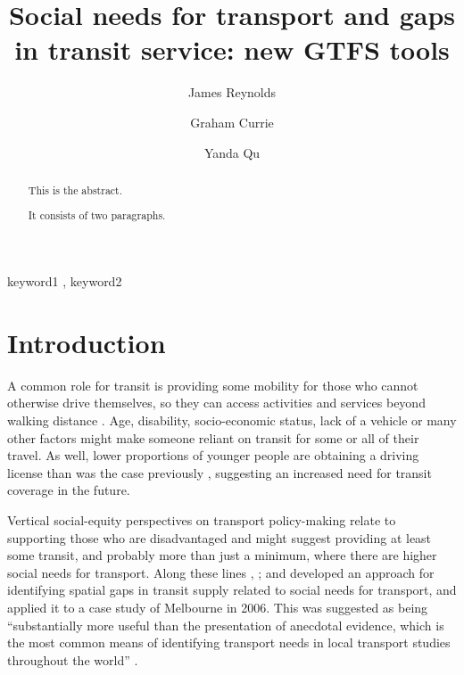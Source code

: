 \documentclass[preprint, 3p,
authoryear]{elsarticle} %
\begin{document}
\begin{frontmatter}

  \title{Social needs for transport and gaps in transit service: new
GTFS tools}
    \author[Public Transport Research Group (PTRG)]{James Reynolds%
  }
    \author[Public Transport Research Group (PTRG)]{Graham Currie%
  }
    \author[Public Transport Research Group (PTRG)]{Yanda Qu%
  }
  
  \begin{abstract}
  This is the abstract.

  It consists of two paragraphs.
  \end{abstract}
    \begin{keyword}
    keyword1 \sep 
    keyword2
  \end{keyword}
  
 \end{frontmatter}

\section{Introduction}\label{introduction}

A common role for transit is providing some mobility for those who
cannot otherwise drive themselves, so they can access activities and
services beyond walking distance \citep{Currie:2016aa}. Age, disability,
socio-economic status, lack of a vehicle or many other factors might
make someone reliant on transit for some or all of their travel. As
well, lower proportions of younger people are obtaining a driving
license than was the case previously \citep{delbosc2013causes},
suggesting an increased need for transit coverage in the future.

Vertical social-equity perspectives on transport policy-making relate to
supporting those who are disadvantaged \citep{Litman:2016aa} and might
suggest providing at least some transit, and probably more than just a
minimum, where there are higher social needs for transport. Along these
lines \citet{Currie2003Hobart}, \citet{Currie2004Gap};
\citet{Currie2007Identifying} and \citet{currie2010identifying}
developed an approach for identifying spatial gaps in transit supply
related to social needs for transport, and applied it to a case study of
Melbourne in 2006. This was suggested as being ``substantially more
useful than the presentation of anecdotal evidence, which is the most
common means of identifying transport needs in local transport studies
throughout the world'' \citep{currie2010identifying}.
\end{document}
